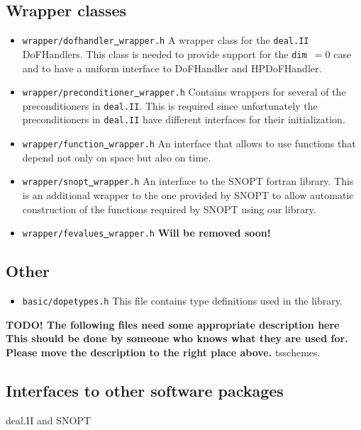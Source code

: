 \documentclass[prodmode,acmtoms]{acmsmall}
\numberwithin{equation}{section}
\begin{document}
\subsection{Wrapper classes}
\begin{itemize}
  \item \texttt{wrapper/dofhandler\underline{ }wrapper.h} A wrapper class for the \texttt{deal.II} DoFHandlers. This 
    class is needed to provide support for the \texttt{dim $= 0$} case and to have a uniform interface to 
    DoFHandler and HPDoFHandler.
  \item \texttt{wrapper/preconditioner\underline{ }wrapper.h} Contains wrappers for several of the preconditioners
    in \texttt{deal.II}. This is required since unfortunately the preconditioners in \texttt{deal.II} have different
    interfaces for their initialization.
  \item \texttt{wrapper/function\underline{ }wrapper.h} An interface that allows to use functions that depend 
    not only on space but also on time.
  \item \texttt{wrapper/snopt\underline{ }wrapper.h} An interface to the SNOPT fortran library. This is an additional
    wrapper to the one provided by SNOPT to allow automatic construction of the functions required 
    by SNOPT using our library.
  \item \texttt{wrapper/fevalues\underline{ }wrapper.h} {\bf Will be removed soon!}
\end{itemize}

\subsection{Other}
\begin{itemize}
  \item \texttt{basic/dopetypes.h} This file contains type definitions used in the library. 
\end{itemize}

{\bf TODO! The following files need some appropriate description here 
This should be done by someone who knows what they are used for. Please move the description to the right place above.} tsschemes.





\subsection{Interfaces to other software packages}
deal.II and SNOPT
\end{document}
